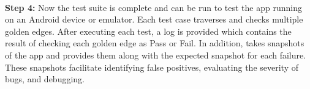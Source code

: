 \indent
\\
\indent
{\bf Step 4:}
Now the test suite is complete and can be run to test the app running on an Android device or emulator.
Each test case traverses and checks multiple golden edges. After executing each test, a log is provided which contains the result of checking each golden edge as Pass or Fail. In addition, \tool{} takes snapshots of the app and provides them along with the expected snapshot for each failure. These snapshots facilitate identifying false positives, evaluating the severity of bugs, and debugging.
